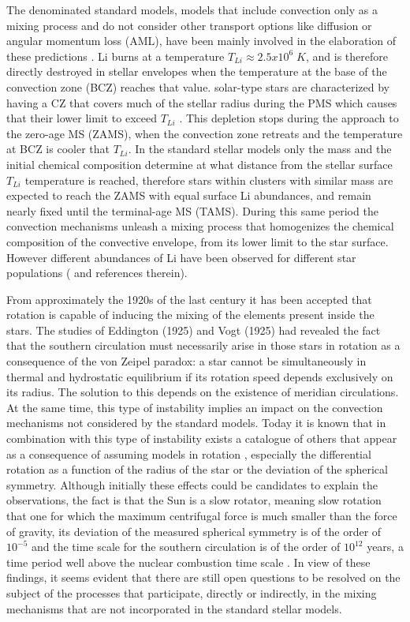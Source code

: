 \documentclass[fleqn,usenatbib]{mnras}
\begin{document}
The denominated standard models, models that include convection only as a mixing process and do not consider other transport options like diffusion or angular momentum loss (AML), have been mainly involved in the elaboration of these predictions \citep{Sestito2005}. Li burns at a temperature $T_{Li} \approx 2.5 x 10^6\; K$, and is therefore directly destroyed in stellar envelopes when the temperature at the base of the convection zone (BCZ) reaches that value. solar-type stars are characterized by having a CZ that covers much of the stellar radius during the PMS which causes that their lower limit to exceed $T_{Li}$ \citep{Iben1965}. This depletion stops during the approach to the zero-age MS (ZAMS), when the convection zone retreats and the temperature at BCZ is cooler that $T_{Li}$. In the standard stellar models only the mass and the initial chemical composition determine at what distance from the stellar surface $T_{Li}$ temperature is reached, therefore stars within clusters with similar mass are expected to reach the ZAMS with equal surface Li abundances, and remain nearly fixed until the terminal-age MS (TAMS). During this same period the convection mechanisms unleash a mixing process that homogenizes the chemical composition of the convective envelope, from its lower limit to the star surface. However different abundances of Li have been observed for different star populations (\citet{Somers2014} and references therein).\par

From approximately the 1920s of the last century it has been accepted that rotation is capable of inducing the mixing of the elements present inside the stars. The studies of Eddington (1925) and Vogt (1925) had revealed the fact that the southern circulation must necessarily arise in those stars in rotation as a consequence of the von Zeipel paradox: a star cannot be simultaneously in thermal and hydrostatic equilibrium if its rotation speed depends exclusively on its radius. The solution to this depends on the existence of meridian circulations. At the same time, this type of instability implies an impact on the convection mechanisms not considered by the standard models. Today it is known that in combination with this type of instability exists a catalogue of others that appear as a consequence of assuming models in rotation \citep{Maeder2003a}, especially the differential rotation as a function of the radius of the star or the deviation of the spherical symmetry. Although initially these effects could be candidates to explain the observations, the fact is that the Sun is a slow rotator, meaning slow rotation that one for which the maximum centrifugal force is much smaller than the force of gravity, its deviation of the measured spherical symmetry is of the order of $10^{-5}$ and the time scale for the southern circulation is of the order of $10^{12}$ years, a time period well above the nuclear combustion time scale \citep{Pinsonneault1997}. In view of these findings, it seems evident that there are still open questions to be resolved on the subject of the processes that participate, directly or indirectly, in the mixing mechanisms that are not incorporated in the standard stellar models.\par
\end{document}

